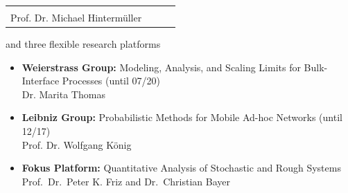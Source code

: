 \documentclass[8pt]{beamer}
\begin{document}
\begin{frame}
\begin{tabular}{cccc}
\begin{tcolorbox}
          \tiny \centering {\sc
            Nonsmooth Variational Problems and Operator Equations
            }
          \\ \null \vfill 
          Prof. Dr. Michael Hinterm\"uller
        \end{tcolorbox}                
  \end{tabular}
  {\footnotesize
    and three flexible research platforms
    \begin{itemize}
    \item {\bf Weierstrass Group:} Modeling, Analysis, and Scaling Limits
      for Bulk-Interface Processes (until 07/20)
      \\Dr. Marita Thomas
    \item {\bf Leibniz Group:} Probabilistic Methods for Mobile Ad-hoc Networks (until 12/17)
      \\Prof. Dr. Wolfgang König
    \item {\bf Fokus Platform:} Quantitative Analysis of Stochastic and Rough
      Systems
      \\Prof.\, Dr.\, Peter K. Friz and Dr.\, Christian Bayer
    \end{itemize}
  }
\end{frame}
%
\end{document}
